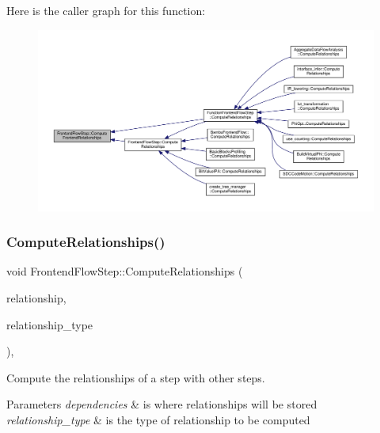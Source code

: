 Here is the caller graph for this function\+:
\nopagebreak
\begin{figure}[H]
\begin{center}
\leavevmode
\includegraphics[width=350pt]{d9/d37/classFrontendFlowStep_abeaff70b59734e462d347ed343dd700d_icgraph}
\end{center}
\end{figure}
\mbox{\label{classFrontendFlowStep_a532ee0d76d7a10c373b4a7478a7eee18}} 
\subsubsection{\texorpdfstring{Compute\+Relationships()}{ComputeRelationships()}}
{\footnotesize\ttfamily void Frontend\+Flow\+Step\+::\+Compute\+Relationships (\begin{DoxyParamCaption}\item[{\hyperlink{classDesignFlowStepSet}{Design\+Flow\+Step\+Set} \&}]{relationship,  }\item[{const \hyperlink{classDesignFlowStep_a723a3baf19ff2ceb77bc13e099d0b1b7}{Design\+Flow\+Step\+::\+Relationship\+Type}}]{relationship\+\_\+type }\end{DoxyParamCaption})\hspace{0.3cm}{\ttfamily [override]}, {\ttfamily [virtual]}}



Compute the relationships of a step with other steps. 


\begin{DoxyParams}{Parameters}
{\em dependencies} & is where relationships will be stored \\
\hline
{\em relationship\+\_\+type} & is the type of relationship to be computed \\
\hline
\end{DoxyParams}


